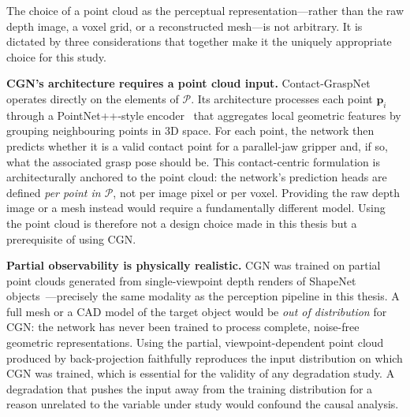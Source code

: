 \documentclass[11pt,a4paper]{report}
\begin{document}
The choice of a point cloud as the perceptual representation---rather than the
raw depth image, a voxel grid, or a reconstructed mesh---is not arbitrary.  It
is dictated by three considerations that together make it the uniquely appropriate
choice for this study.

\textbf{CGN's architecture requires a point cloud input.}
Contact-GraspNet~\cite{sundermeyer2021contact} operates directly on the elements
of $\mathcal{P}$.  Its architecture processes each point $\mathbf{p}_i$ through a
PointNet++-style encoder~\cite{qi2017pointnetpp} that aggregates local geometric
features by grouping neighbouring points in 3D space.  For each point, the network
then predicts whether it is a valid contact point for a parallel-jaw gripper and,
if so, what the associated grasp pose should be.  This contact-centric formulation
is architecturally anchored to the point cloud: the network's prediction heads
are defined \emph{per point in $\mathcal{P}$}, not per image pixel or per voxel.
Providing the raw depth image or a mesh instead would require a fundamentally
different model.  Using the point cloud is therefore not a design choice made in
this thesis but a prerequisite of using CGN.

\textbf{Partial observability is physically realistic.}
CGN was trained on partial point clouds generated from single-viewpoint depth
renders of ShapeNet objects~\cite{sundermeyer2021contact}---precisely the same
modality as the perception pipeline in this thesis.  A full mesh or a CAD model
of the target object would be \emph{out of distribution} for CGN: the network has
never been trained to process complete, noise-free geometric representations.
Using the partial, viewpoint-dependent point cloud produced by back-projection
faithfully reproduces the input distribution on which CGN was trained, which is
essential for the validity of any degradation study.  A degradation that pushes
the input away from the training distribution for a reason unrelated to the
variable under study would confound the causal analysis.
\end{document}
